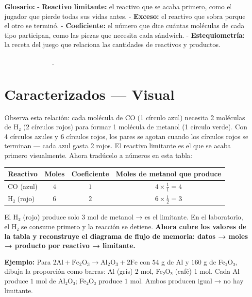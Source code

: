 \documentclass[
  spanish,
  letterpaper,
  12pt,
  oneside,
  open=any]{scrbook}
\newcounter{none} %
\newcommand{\setcolorsection}[2]{%
  \definecolor{currentsectionbg}{HTML}{#1}%
  \definecolor{currentsectionborder}{HTML}{#2}%
}
\begin{document}
\textbf{Glosario:} - \textbf{Reactivo limitante:} el reactivo que se
acaba primero, como el jugador que pierde todas sus vidas antes. -
\textbf{Exceso:} el reactivo que sobra porque el otro se terminó. -
\textbf{Coeficiente:} el número que dice cuántas moléculas de cada tipo
participan, como las piezas que necesita cada sándwich. -
\textbf{Estequiometría:} la receta del juego que relaciona las
cantidades de reactivos y productos.

\(\underline{\hspace{6cm}}\)

\setcolorsection{d6c7e7}{c0b0d8}

\section{Caracterizados --- Visual}\label{caracterizados-visual}

Observa esta relación: cada molécula de CO (1 círculo azul) necesita 2
moléculas de H₂ (2 círculos rojos) para formar 1 molécula de metanol (1
círculo verde). Con 4 círculos azules y 6 círculos rojos, los pares se
agotan cuando los círculos rojos se terminan --- cada azul gasta 2
rojos. El reactivo limitante es el que se acaba primero visualmente.
Ahora tradúcelo a números en esta tabla:

{\def\LTcaptype{none} %
\begin{longtable}[]{@{}lccc@{}}
\toprule\noalign{}
Reactivo & Moles & Coeficiente & Moles de metanol que produce \\
\midrule\noalign{}
\endhead
\bottomrule\noalign{}
\endlastfoot
CO (azul) & \(4\) & \(1\) & \(4 \times \frac{1}{1} = 4\) \\
H₂ (rojo) & \(6\) & \(2\) & \(6 \times \frac{1}{2} = 3\) \\
\end{longtable}
}

El H₂ (rojo) produce solo \(3\) mol de metanol → es el limitante. En el
laboratorio, el H₂ se consume primero y la reacción se detiene.
\textbf{Ahora cubre los valores de la tabla y reconstruye el diagrama de
flujo de memoria: datos → moles → producto por reactivo → limitante.}

\textbf{Ejemplo:} Para
\(2\text{Al} + \text{Fe}_2\text{O}_3 \rightarrow \text{Al}_2\text{O}_3 + 2\text{Fe}\)
con \(54\) g de Al y \(160\) g de Fe₂O₃, dibuja la proporción como
barras: Al (gris) \(2\) mol, Fe₂O₃ (café) \(1\) mol. Cada Al produce
\(1\) mol de Al₂O₃; Fe₂O₃ produce \(1\) mol. Ambos producen igual → no
hay limitante.
\end{document}
